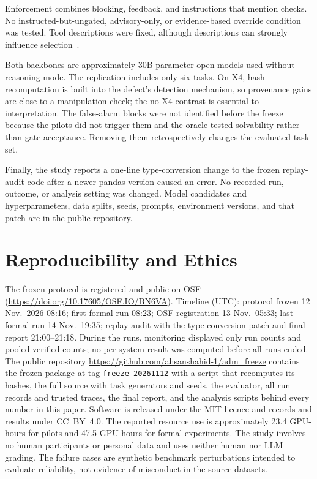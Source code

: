 \documentclass[conference]{IEEEtran}
\newcommand{\code}[1]{\texttt{#1}}
\begin{document}
Enforcement combines blocking, feedback, and instructions that mention checks. No instructed-but-ungated, advisory-only, or evidence-based override condition was tested. Tool descriptions were fixed, although descriptions can strongly influence selection~\cite{faghih2025toolprefs}.

Both backbones are approximately 30B-parameter open models used without reasoning mode. The replication includes only six tasks. On X4, hash recomputation is built into the defect's detection mechanism, so provenance gains are close to a manipulation check; the no-X4 contrast is essential to interpretation. The false-alarm blocks were not identified before the freeze because the pilots did not trigger them and the oracle tested solvability rather than gate acceptance. Removing them retrospectively changes the evaluated task set.

Finally, the study reports a one-line type-conversion change to the frozen replay-audit code after a newer pandas version caused an error. No recorded run, outcome, or analysis setting was changed. Model candidates and hyperparameters, data splits, seeds, prompts, environment versions, and that patch are in the public repository.

\section{Reproducibility and Ethics}
The frozen protocol is registered and public on OSF (\url{https://doi.org/10.17605/OSF.IO/BN6VA}). Timeline (UTC): protocol frozen 12 Nov.\ 2026 08:16; first formal run 08:23; OSF registration 13 Nov.\ 05:33; last formal run 14 Nov.\ 19:35; replay audit with the type-conversion patch and final report 21:00--21:18. During the runs, monitoring displayed only run counts and pooled verified counts; no per-system result was computed before all runs ended. The public repository \url{https://github.com/ahsanshahid-1/adm_freeze} contains the frozen package at tag \code{freeze-20261112} with a script that recomputes its hashes, the full source with task generators and seeds, the evaluator, all run records and trusted traces, the final report, and the analysis scripts behind every number in this paper. Software is released under the MIT licence and records and results under CC~BY~4.0. The reported resource use is approximately 23.4 GPU-hours for pilots and 47.5 GPU-hours for formal experiments. The study involves no human participants or personal data and uses neither human nor LLM grading. The failure cases are synthetic benchmark perturbations intended to evaluate reliability, not evidence of misconduct in the source datasets.
\end{document}
